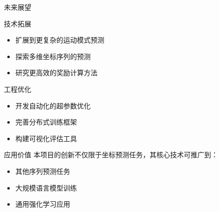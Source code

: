 \begin{frame}{未来展望}
    \begin{block}{技术拓展}
        \begin{itemize}
            \item 扩展到更复杂的运动模式预测
            \item 探索多维坐标序列的预测
            \item 研究更高效的奖励计算方法
        \end{itemize}
    \end{block}
    
    \begin{block}{工程优化}
        \begin{itemize}
            \item 开发自动化的超参数优化
            \item 完善分布式训练框架
            \item 构建可视化评估工具
        \end{itemize}
    \end{block}
    
    \begin{alertblock}{应用价值}
        本项目的创新不仅限于坐标预测任务，其核心技术可推广到：
        \begin{itemize}
            \item 其他序列预测任务
            \item 大规模语言模型训练
            \item 通用强化学习应用
        \end{itemize}
    \end{alertblock}
\end{frame}